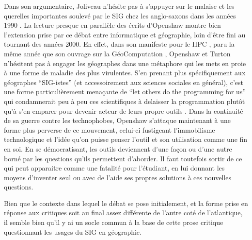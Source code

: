 Dans son argumentaire, Joliveau n'hésite pas à s'appuyer sur le malaise et les querelles importantes soulevé par le SIG chez les anglo-saxons dans les années 1990 \autocite[472-473]{Joliveau2004}. La lecture presque en parallèle des écrits d'Openshaw montre bien l'extension prise par ce débat entre informatique et géographie, loin d'être fini au tournant des années 2000. En effet, dans son manifeste pour le HPC \autocite[2]{Openshaw2000}, paru la même année que son ouvrage sur la GéoComputation \autocite{Openshaw2000b}, Openshaw et Turton n’hésitent pas à engager les géographes dans une métaphore qui les mets en proie à une forme de maladie des plus virulentes. S'en prenant plus spécifiquement aux géographes \enquote{SIG-istes} (et accessoirement aux sciences sociales en général), c’est une forme particulièrement menaçante de \foreignquote{english}{let others do the programming for us} qui condamnerait peu à peu ces scientifiques à delaisser la programmation plutôt qu’à s’en emparer pour devenir acteur de leurs propre outils . Dans la continuité de sa guerre contre les technophobes, Openshaw s'attaque  maintenant à une forme plus perverse de ce mouvement, celui-ci fustigeant l'immobilisme technologique et l'idée qu'on puisse penser l'outil et son utilisation comme une fin en soi. En se démocratisant, les outils deviennent d'une façon ou d'une autre borné par les questions qu'ils permettent d'aborder. Il faut toutefois sortir de ce qui peut apparaitre comme une fatalité pour l'étudiant, en lui donnant les moyens d'inventer seul ou avec de l'aide ses propres solutions à ces nouvelles questions.

Bien que le contexte dans lequel le débat se pose initialement, et la forme prise en réponse aux critiques soit au final assez différente de l'autre coté de l'atlantique, il semble bien qu'il y ai un socle commun à la base de cette prose critique questionnant les usages du SIG en géographie.

